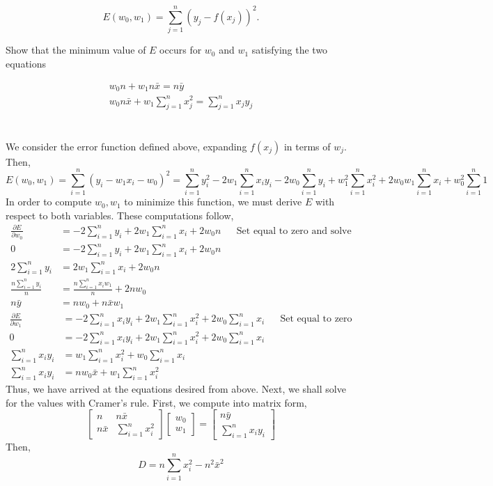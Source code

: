 \documentclass[letterpaper,10pt]{article}
\newcommand{\sx}{\sum_{i=1}^nx_i}
\newcommand{\sy}{\sum_{i=1}^ny_i}
\newcommand{\sxy}{\sum_{i=1}^nx_iy_i}
\begin{document}
\begin{enumerate}
\[E(w_0,w_1) = \sum_{j=1}^n\left( y_j - f(x_j)\right)^2.\]

Show that the minimum value of $E$ occurs for $w_0$ and $w_1$ satisfying the two equations

\begin{align*}
w_0 n + w_1n\bar{x} = n\bar{y}\\
w_0n\bar{x} + w_1 \sum_{j=1}^nx_j^2 = \sum_{j=1}^nx_jy_j
\end{align*}
\\\\
We consider the error function defined above, expanding $f(x_j)$ in terms of $w_j$. Then,
\[E(w_0,w_1)=\sum_{i=1}^n(y_i-w_1x_i-w_0)^2=\sum_{i=1}^ny_i^2-2w_1\sxy-2w_0\sy+w_1^2\sum_{i=1}^nx_i^2+2w_0w_1\sx+w_0^2\sum_{i=1}^n1\]
In order to compute $w_0,w_1$ to minimize this function, we must derive $E$ with respect to both variables. These computations follow,
\begin{align*}
\frac{\partial E}{\partial w_0} &= -2\sy+2w_1\sx+2w_0n &&\text{Set equal to zero and solve} \\
0 &= -2\sy+2w_1\sx+2w_0n \\
2\sy &= 2w_1\sx+2w_0n \\
\frac{n\sy}{n} &= \frac{n\sx w_1}{n} + 2nw_0\\
n\bar{y} &= nw_0+n\bar{x}w_1
\end{align*}
\begin{align*}
\frac{\partial E}{\partial w_1} &= -2\sxy +2w_1\sum_{i=1}^n x_i^2 +2w_0\sx &&\text{Set equal to zero and solve} \\
0 &= -2\sxy +2w_1\sum_{i=1}^n x_i^2 +2w_0\sx \\
\sxy &= w_1\sum_{i=1}^n x_i^2 +w_0\sx\\
\sxy &= nw_0\bar{x}+w_1\sum_{i=1}^n x_i^2
\end{align*}
Thus, we have arrived at the equations desired from above. Next, we shall solve for the values with Cramer's rule. First, we compute into matrix form,
\[\begin{bmatrix}
n & n\bar{x} \\
n\bar{x} & \sum_{i=1}^n x_i^2
\end{bmatrix}
\begin{bmatrix}
w_0 \\
w_1
\end{bmatrix}=\begin{bmatrix}
n\bar{y}\\
\sxy
\end{bmatrix}\]
Then, \[D=n\sum_{i=1}^n x_i^2-n^2\bar{x}^2\]

\end{enumerate}
\end{document}
